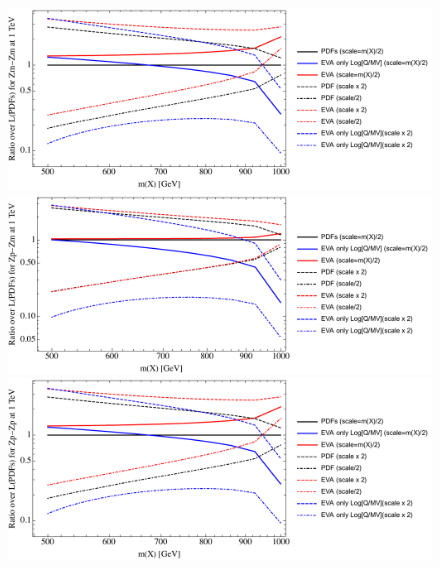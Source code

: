 \documentclass[a4paper,11pt]{article}
\begin{document}
\begin{figure}[ht]
\includegraphics[width=0.46\linewidth]{Notebooks/PlotLumi/1TeV/ratios/Zm-Zm.pdf}
\includegraphics[width=0.46\linewidth]{Notebooks/PlotLumi/1TeV/ratios/Zp-Zm.pdf}
\includegraphics[width=0.46\linewidth]{Notebooks/PlotLumi/1TeV/ratios/Zp-Zp.pdf}
\end{figure}

%
%
%
\end{document}
